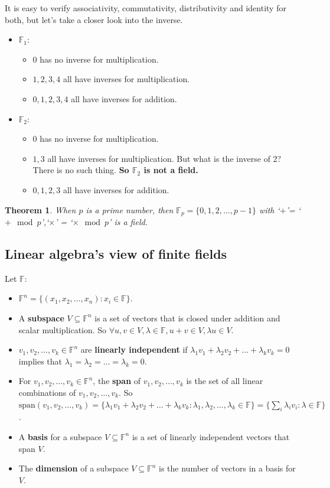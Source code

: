 \documentclass[letterpaper,12pt]{article}
\newtheorem{theorem}{Theorem}
\begin{document}
It is easy to verify associativity, commutativity, distributivity and identity
for both, but let's take a closer look into the inverse.
\begin{itemize}
    \item $\mathbb{F}_1$: \begin{itemize}
              \item $0$ has no inverse for multiplication.
              \item $1,2,3,4$ all have inverses for multiplication.
              \item $0,1,2,3,4$ all have inverses for addition.
          \end{itemize}
    \item $\mathbb{F}_2$: \begin{itemize}
              \item $0$ has no inverse for multiplication.
              \item $1,3$ all have inverses for multiplication. But what is the inverse of 2? There is no such thing. \textbf{So $\mathbb{F}_2$ is not a field.}
              \item $0,1,2,3$ all have inverses for addition.
          \end{itemize}
\end{itemize}
\begin{theorem}
    When $p$ is a prime number, then $\mathbb{F}_p = \{0,1,2,\ldots,p-1\}$ with `$+$'= `$+\mod p$',`$\times$' = `$\times\mod p$' is a field.
\end{theorem}
\subsection{Linear algebra's view of finite fields}
Let $\mathbb{F}$:\begin{itemize}
    \item $\mathbb{F}^n = \{(x_1, x_2, \ldots, x_n): x_i\in \mathbb{F}\}$.
    \item A \textbf{subspace} $V\subseteq \mathbb{F}^n$ is a set of vectors that is
          closed under addition and scalar multiplication. So $\forall u,v\in V,
              \lambda\in \mathbb{F}, u+v\in V, \lambda u\in V$.
    \item $v_1,v_2,\ldots,v_k\in \mathbb{F}^n$ are \textbf{linearly independent} if $\lambda_1v_1+\lambda_2v_2+\ldots+\lambda_kv_k=0$ implies that $\lambda_1=\lambda_2=\ldots=\lambda_k=0$.
    \item For $v_1,v_2,\ldots,v_k\in \mathbb{F}^n$, the \textbf{span} of
          $v_1,v_2,\ldots,v_k$ is the set of all linear combinations of
          $v_1,v_2,\ldots,v_k$. So
          $\text{span}(v_1,v_2,\ldots,v_k)=\{\lambda_1v_1+\lambda_2v_2+\ldots+\lambda_kv_k:
              \lambda_1,\lambda_2,\ldots,\lambda_k\in \mathbb{F}\}=\{\sum_i \lambda_i
              v_i:\lambda \in \mathbb{F}\}$.
    \item A \textbf{basis} for a subspace $V\subseteq \mathbb{F}^n$ is a set of linearly
          independent vectors that span $V$.
    \item The \textbf{dimension} of a subspace $V\subseteq \mathbb{F}^n$ is the number of
          vectors in a basis for $V$.
\end{itemize}
\end{document}
